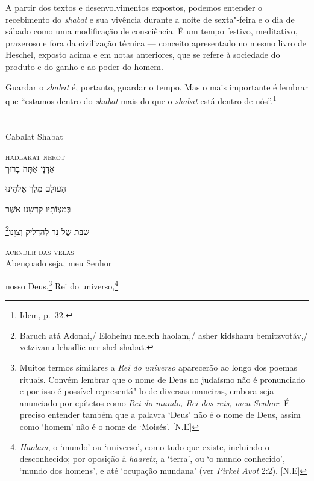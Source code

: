 A partir dos textos e desenvolvimentos expostos, podemos entender
o recebimento do \emph{shabat} e sua vivência durante a noite de sexta"-feira e o dia de sábado como uma modificação de consciência. É um tempo festivo, meditativo, prazeroso e fora da civilização técnica --- conceito apresentado no mesmo livro de Heschel, exposto acima e em notas anteriores, que se refere à sociedade do produto e do ganho e ao poder do homem.

Guardar o \emph{shabat} é, portanto, guardar o tempo. Mas o mais importante é lembrar que ``estamos dentro do \emph{shabat} mais do que o \emph{shabat} está dentro de nós''.\footnote{Idem, p.~32.}


\chapter*{}
\begin{center}
\begin{vplace}[0.3]
\Large
Cabalat Shabat
\end{vplace}
\end{center}
\thispagestyle{empty}


\movetoevenpage
\raggedleft



\textsc{hadlakat nerot}\\[15pt]

אַדָנָי אַתָּה בָּרוּך

הָעוֹלָם מֶלֶך אֱלהֵינוּ

בְּמִצְוֹתָיו קִדְשָנוּ אַשֶׁר

\footnote{Baruch atá Adonai,/ Eloheinu melech haolam,/ asher kidshanu bemitzvotáv,/ vetzivanu lehadlic ner shel shabat.}שַבָּת שֶל נֵר לְהַדְלִיק וְצִוָנוּ‏

\movetooddpage
\raggedright

\textsc{acender das velas}\\[15pt]

Abençoado seja, meu Senhor

nosso Deus,\footnote{
		Muitos termos similares a \textit{Rei do universo} aparecerão
		ao longo dos poemas rituais. Convém lembrar que o nome de Deus
		no judaísmo não é pronunciado e por isso é possível
		representá"-lo de diversas maneiras, embora seja anunciado por
		epítetos como \textit{Rei do mundo, Rei dos reis, meu Senhor}.
		É preciso entender também que a palavra `Deus' não é o nome de
		Deus, assim como `homem' não é o nome de `Moisés'. [N.E]} 
Rei do universo,\footnote{\textit{Haolam}, o `mundo' ou `universo', como tudo
		que existe, incluindo o desconhecido; por oposição à \textit{haaretz},
		a `terra', ou `o mundo conhecido', `mundo dos homens', e até `ocupação
		mundana' (ver \textit{Pirkei Avot} 2:2). [N.E]}

